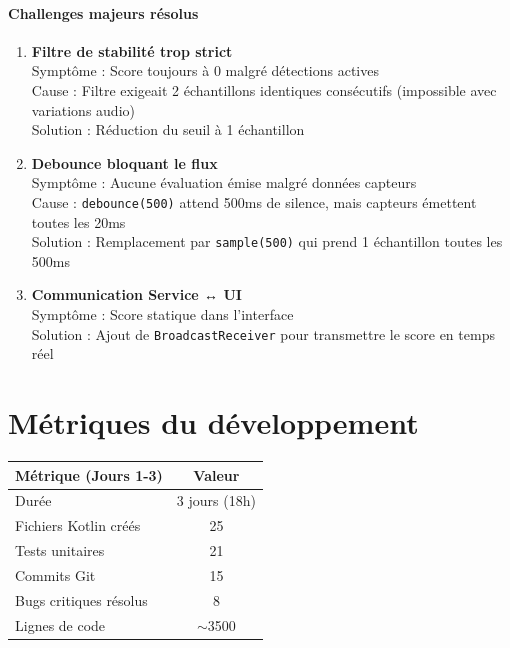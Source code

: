 \documentclass[11pt,a4paper]{article}
\begin{document}
\paragraph{Challenges majeurs résolus}
\begin{enumerate}
    \item \textbf{Filtre de stabilité trop strict} \\
    Symptôme : Score toujours à 0 malgré détections actives \\
    Cause : Filtre exigeait 2 échantillons identiques consécutifs (impossible avec variations audio) \\
    Solution : Réduction du seuil à 1 échantillon
    
    \item \textbf{Debounce bloquant le flux} \\
    Symptôme : Aucune évaluation émise malgré données capteurs \\
    Cause : \texttt{debounce(500)} attend 500ms de silence, mais capteurs émettent toutes les 20ms \\
    Solution : Remplacement par \texttt{sample(500)} qui prend 1 échantillon toutes les 500ms
    
    \item \textbf{Communication Service ↔ UI} \\
    Symptôme : Score statique dans l'interface \\
    Solution : Ajout de \texttt{BroadcastReceiver} pour transmettre le score en temps réel
\end{enumerate}

\section{Métriques du développement}

\begin{center}
\begin{tabular}{lc}
\toprule
\textbf{Métrique (Jours 1-3)} & \textbf{Valeur}\\
\midrule
Durée & 3 jours (18h)\\
Fichiers Kotlin créés & 25\\
Tests unitaires & 21\\
Commits Git & 15\\
Bugs critiques résolus & 8\\
Lignes de code & $\sim$3500\\
\bottomrule
\end{tabular}
\end{center}
\end{document}
